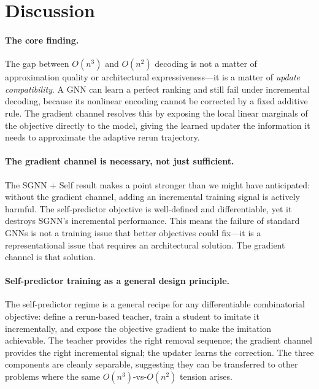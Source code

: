 \documentclass[11pt]{article}
\theoremstyle{plain}
\theoremstyle{definition}
\theoremstyle{remark}
\begin{document}
\section{Discussion}
\label{sec:discussion}

\paragraph{The core finding.}
The gap between $O(n^3)$ and $O(n^2)$ decoding is not a matter of approximation
quality or architectural expressiveness---it is a matter of \emph{update
compatibility}. A GNN can learn a perfect ranking and still fail under incremental
decoding, because its nonlinear encoding cannot be corrected by a fixed additive
rule. The gradient channel resolves this by exposing the local linear marginals of
the objective directly to the model, giving the learned updater the information it
needs to approximate the adaptive rerun trajectory.

\paragraph{The gradient channel is necessary, not just sufficient.}
The SGNN + Self result makes a point stronger than we might have anticipated: without
the gradient channel, adding an incremental training signal is actively harmful. The
self-predictor objective is well-defined and differentiable, yet it destroys SGNN's
incremental performance. This means the failure of standard GNNs is not a training
issue that better objectives could fix---it is a representational issue that requires
an architectural solution. The gradient channel is that solution.

\paragraph{Self-predictor training as a general design principle.}
The self-predictor regime is a general recipe for any differentiable combinatorial
objective: define a rerun-based teacher, train a student to imitate it incrementally,
and expose the objective gradient to make the imitation achievable. The teacher
provides the right removal sequence; the gradient channel provides the right
incremental signal; the updater learns the correction. The three components are
cleanly separable, suggesting they can be transferred to other problems where the
same $O(n^3)$-vs-$O(n^2)$ tension arises.
\end{document}
